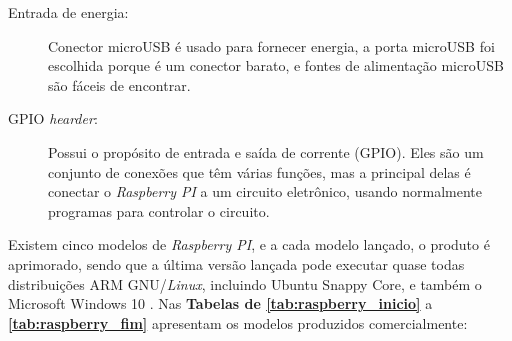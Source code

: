 \documentclass[
	12pt,				%
	openright,			%
	twoside,			%
	a4paper,			%
	chapter=TITLE,		%
	english,			%
	brazil				%
	]{abntex2}
\begin{document}
\begin{description}
\item[Entrada de energia:] 
 Conector microUSB é usado para fornecer energia, a porta microUSB foi escolhida porque é um conector barato, e fontes de alimentação microUSB são fáceis de encontrar.

\item[GPIO \textit{hearder}:]
Possui o propósito de entrada e saída de corrente (GPIO). Eles são um conjunto de conexões que têm várias funções, mas a principal delas é conectar o \textit{Raspberry PI} a um circuito eletrônico, usando normalmente programas para controlar o circuito.


\end{description}

Existem cinco modelos de \textit{Raspberry PI}, e a cada modelo lançado, o produto é aprimorado, sendo que a última versão lançada pode executar quase todas distribuições ARM GNU/\textit{Linux}, incluindo Ubuntu Snappy Core, e também o Microsoft Windows 10 \cite{raspberrypi.org}. Nas \textbf{Tabelas de \ref{tab:raspberry_inicio}} a \textbf{\ref{tab:raspberry_fim}} apresentam os modelos produzidos comercialmente:
\end{document}
